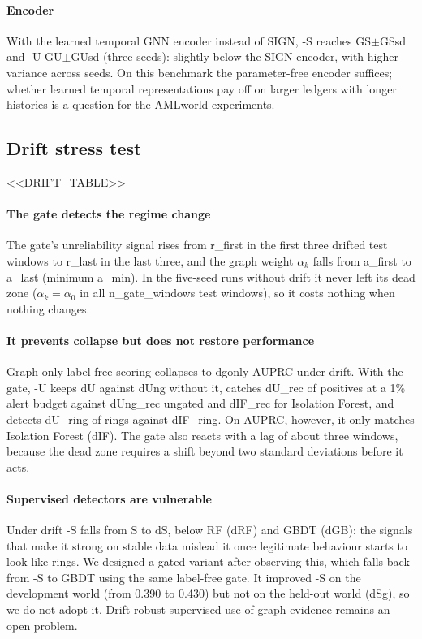 \paragraph{Encoder}
With the learned temporal GNN encoder instead of SIGN, \coral{}-S reaches {{GS}}$\pm${{GSsd}} and \coral{}-U {{GU}}$\pm${{GUsd}} (three seeds): slightly below the SIGN encoder, with higher variance across seeds. On this benchmark the parameter-free encoder suffices; whether learned temporal representations pay off on larger ledgers with longer histories is a question for the AMLworld experiments.

\subsection{Drift stress test}
\label{sec:drift}

<<DRIFT_TABLE>>

\paragraph{The gate detects the regime change}
The gate's unreliability signal rises from {{r_first}} in the first three drifted test windows to {{r_last}} in the last three, and the graph weight $\alpha_k$ falls from {{a_first}} to {{a_last}} (minimum {{a_min}}). In the five-seed runs without drift it never left its dead zone ($\alpha_k=\alpha_0$ in all {{n_gate_windows}} test windows), so it costs nothing when nothing changes.

\paragraph{It prevents collapse but does not restore performance}
Graph-only label-free scoring collapses to {{dgonly}} AUPRC under drift. With the gate, \coral{}-U keeps {{dU}} against {{dUng}} without it, catches {{dU_rec}} of positives at a 1\% alert budget against {{dUng_rec}} ungated and {{dIF_rec}} for Isolation Forest, and detects {{dU_ring}} of rings against {{dIF_ring}}. On AUPRC, however, it only matches Isolation Forest ({{dIF}}). The gate also reacts with a lag of about three windows, because the dead zone requires a shift beyond two standard deviations before it acts.

\paragraph{Supervised detectors are vulnerable}
Under drift \coral{}-S falls from {{S}} to {{dS}}, below RF ({{dRF}}) and GBDT ({{dGB}}): the signals that make it strong on stable data mislead it once legitimate behaviour starts to look like rings. We designed a gated variant after observing this, which falls back from \coral{}-S to GBDT using the same label-free gate. It improved \coral{}-S on the development world (from 0.390 to 0.430) but not on the held-out world ({{dSg}}), so we do not adopt it. Drift-robust supervised use of graph evidence remains an open problem.
